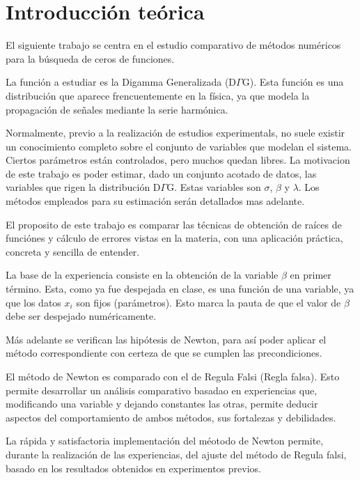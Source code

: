 \section{Introducci\'on te\'orica}

El siguiente trabajo se centra en el estudio comparativo de m\'etodos
num\'ericos para la b\'usqueda de ceros de funciones. 

La funci\'on a estudiar es la Digamma Generalizada (D$\Gamma$G). 
Esta funci\'on es una distribuci\'on que aparece frencuentemente en la f\'isica,
ya que modela la propagaci\'on de se\~nales mediante la serie harm\'onica.

Normalmente, previo a la realizaci\'on de estudios experimentals, no suele
existir un conocimiento completo sobre el conjunto de variables que modelan
el sistema. Ciertos par\'ametros est\'an controlados, pero muchos quedan libres. 
La motivacion de este trabajo es poder estimar, dado un conjunto acotado de datos, 
las variables que rigen la distribuci\'on D$\Gamma$G. 
Estas variables son $\sigma$, $\beta$ y $\lambda$. Los m\'etodos empleados para 
su estimaci\'on ser\'an detallados mas adelante.

El proposito de este trabajo es comparar las t\'ecnicas de obtenci\'on de ra\'ices 
de funci\'ones y c\'alculo de errores vistas en la materia, 
con una aplicaci\'on pr\'actica, concreta y sencilla de entender.

La base de la experiencia consiste en la obtenci\'on de la variable $\beta$ en
primer t\'ermino. Esta, como ya fue despejada en clase, es una funci\'on
de una variable, ya que los datos $x_i$ son fijos (par\'ametros). 
Esto marca la pauta de que el valor de $\beta$ debe ser despejado
num\'ericamente. 

M\'as adelante se verifican las hip\'otesis de Newton, para as\'i poder aplicar
el m\'etodo correspondiente con certeza de que se cumplen las precondiciones.

El m\'etodo de Newton es comparado con el de Regula Falsi (Regla falsa). Esto
permite desarrollar un an\'alisis comparativo basadao en experiencias que,
modificando una variable y dejando constantes las otras, permite deducir
aspectos del comportamiento de ambos m\'etodos, sus fortalezas y debilidades.

La r\'apida y satisfactoria implementaci\'on del m\'eotodo de Newton permite,
durante la realizaci\'on de las experiencias, del ajuste del m\'etodo de Regula
falsi, basado en los resultados obtenidos en experimentos previos.
